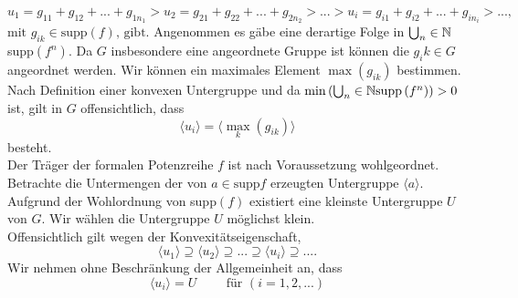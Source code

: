 {\begin{equation}\label{eq: folgefürinvers}
u_1 = g_{11} +g_{12} + ...+ g_{1{n_1}} > u_2 = g_{21} +g_{22} + ...+ g_{2n_2} > ... > u_i = g_{i1} +g_{i2} + ...+ g_{in_i} > ..., 
\end{equation} 
$\text{mit } g_{ik} \in \text{supp}(f)\text{, gibt.}$
%
Angenommen es gäbe eine derartige Folge in $\bigcup_n\in\mathbb{N}$ supp$(f^n)$.
%
%
% 
%
%
Da $G$ insbesondere eine angeordnete Gruppe ist können die $g_ik \in G$ angeordnet werden. Wir können ein maximales Element $\max\left( g_{ik}\right)$ bestimmen. Nach Definition einer konvexen Untergruppe und da $\min\left(\bigcup_n \in \mathbb{N} \text{supp}\left(f^n\right)\right) > 0$ ist, gilt in $G$ offensichtlich, dass
\[ \langle u_i\rangle = \langle \max_k\left( g_{ik}\right)\rangle \]
besteht. \\
%
%
%
Der Träger der formalen Potenzreihe $f$ ist nach Voraussetzung wohlgeordnet. Betrachte die Untermengen der von $a \in \text{supp}f$ erzeugten Untergruppe $\langle a \rangle$. Aufgrund der Wohlordnung von supp$(f)$ existiert eine kleinste Untergruppe $U$ von $G$.
Wir wählen die Untergruppe $U$ möglichst klein.\\
%
%
%
%
Offensichtlich gilt wegen der Konvexitätseigenschaft, 
\[\langle u_1 \rangle \supseteq \langle u_2 \rangle \supseteq ... \supseteq \langle u_i \rangle \supseteq ....\]
%
Wir nehmen ohne Beschränkung der Allgemeinheit an, dass
\[\langle u_i \rangle = U ~~~~~~~~~\text{ für }\left(i = 1, 2,...\right)\]

}
